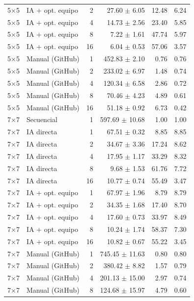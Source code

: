 \begin{tabular}{llrrrr}
5$\times$5 & IA + opt. equipo & 2 & 27.60 $\pm$ 6.05 & 12.48 & 6.24 \\
5$\times$5 & IA + opt. equipo & 4 & 14.73 $\pm$ 2.56 & 23.40 & 5.85 \\
5$\times$5 & IA + opt. equipo & 8 & 7.22 $\pm$ 1.61 & 47.74 & 5.97 \\
5$\times$5 & IA + opt. equipo & 16 & 6.04 $\pm$ 0.53 & 57.06 & 3.57 \\
5$\times$5 & Manual (GitHub) & 1 & 452.83 $\pm$ 2.10 & 0.76 & 0.76 \\
5$\times$5 & Manual (GitHub) & 2 & 233.02 $\pm$ 6.97 & 1.48 & 0.74 \\
5$\times$5 & Manual (GitHub) & 4 & 120.34 $\pm$ 6.58 & 2.86 & 0.72 \\
5$\times$5 & Manual (GitHub) & 8 & 70.46 $\pm$ 4.23 & 4.89 & 0.61 \\
5$\times$5 & Manual (GitHub) & 16 & 51.18 $\pm$ 0.92 & 6.73 & 0.42 \\
\midrule
7$\times$7 & Secuencial & 1 & 597.69 $\pm$ 10.68 & 1.00 & 1.00 \\
7$\times$7 & IA directa & 1 & 67.51 $\pm$ 0.32 & 8.85 & 8.85 \\
7$\times$7 & IA directa & 2 & 34.67 $\pm$ 3.36 & 17.24 & 8.62 \\
7$\times$7 & IA directa & 4 & 17.95 $\pm$ 1.17 & 33.29 & 8.32 \\
7$\times$7 & IA directa & 8 & 9.68 $\pm$ 1.53 & 61.76 & 7.72 \\
7$\times$7 & IA directa & 16 & 10.77 $\pm$ 0.74 & 55.49 & 3.47 \\
7$\times$7 & IA + opt. equipo & 1 & 67.97 $\pm$ 1.96 & 8.79 & 8.79 \\
7$\times$7 & IA + opt. equipo & 2 & 34.35 $\pm$ 1.68 & 17.40 & 8.70 \\
7$\times$7 & IA + opt. equipo & 4 & 17.60 $\pm$ 0.73 & 33.97 & 8.49 \\
7$\times$7 & IA + opt. equipo & 8 & 10.24 $\pm$ 1.74 & 58.37 & 7.30 \\
7$\times$7 & IA + opt. equipo & 16 & 10.82 $\pm$ 0.67 & 55.22 & 3.45 \\
7$\times$7 & Manual (GitHub) & 1 & 745.45 $\pm$ 11.63 & 0.80 & 0.80 \\
7$\times$7 & Manual (GitHub) & 2 & 380.42 $\pm$ 8.82 & 1.57 & 0.79 \\
7$\times$7 & Manual (GitHub) & 4 & 201.13 $\pm$ 15.00 & 2.97 & 0.74 \\
7$\times$7 & Manual (GitHub) & 8 & 124.68 $\pm$ 15.97 & 4.79 & 0.60 \\

\end{tabular}
